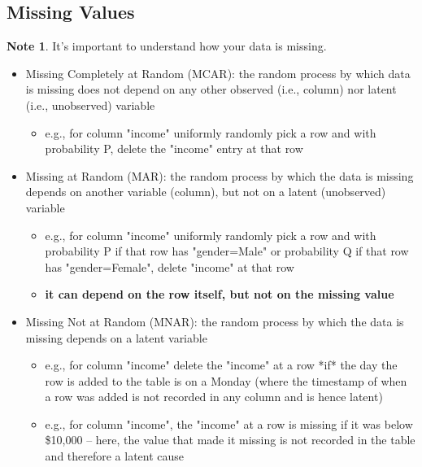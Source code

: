 \documentclass[11pt]{article}
\theoremstyle{definition}
\newtheorem{note}{Note}
\begin{document}
\subsection{Missing Values}
\begin{note}
    It's important to understand how your data is missing.
\end{note}
\begin{itemize}
    \item Missing Completely at Random (MCAR): the random process by which data is
    missing does not depend on any other observed (i.e., column) nor latent
    (i.e., unobserved) variable
    \begin{itemize}
        \item e.g., for column "income" uniformly randomly pick a row and with probability P, delete the
        "income" entry at that row
    \end{itemize}
    \item Missing at Random (MAR): the random process by which the data is missing
    depends on another variable (column), but not on a latent (unobserved) variable
    \begin{itemize}
        \item e.g., for column "income" uniformly randomly pick a row and with probability P if that row has
        "gender=Male" or probability Q if that row has "gender=Female", delete "income" at that row
        \item \textbf{it can depend on the row itself, but not on the missing value}
    \end{itemize}
    \item Missing Not at Random (MNAR): the random process by which the data is missing depends on a latent variable
    \begin{itemize}
        \item e.g., for column "income" delete the "income" at a row *if* the day the row is added to the
        table is on a Monday (where the timestamp of when a row was added is not recorded in any
        column and is hence latent)
        \item e.g., for column "income", the "income" at a row is missing if it was below \$10,000 – here, the
        value that made it missing is not recorded in the table and therefore a latent cause
    \end{itemize}
\end{itemize}
\end{document}

